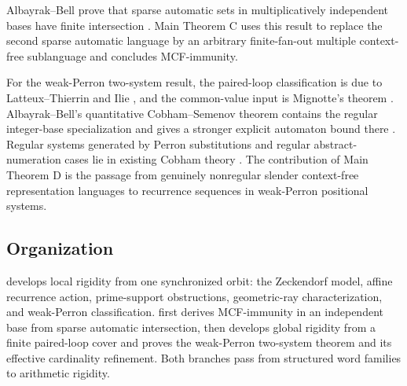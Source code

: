 Albayrak--Bell prove that sparse automatic sets in multiplicatively
independent bases have finite intersection
\cite[Theorem~1.1]{AlbayrakBell2023}. Main Theorem C uses this result to
replace the second sparse automatic language by an arbitrary finite-fan-out
multiple context-free sublanguage and concludes MCF-immunity.

For the weak-Perron two-system result, the paired-loop classification is
due to
Latteux--Thierrin and Ilie
\cite{LatteuxThierrin1983,Ilie1994,IlieRozenbergSalomaa2000}, and the
common-value input is Mignotte's theorem
\cite{Mignotte1978Intersection}. Albayrak--Bell's quantitative
Cobham--Semenov theorem contains the regular integer-base specialization
and gives a stronger explicit automaton bound there
\cite[Theorem~4.1]{AlbayrakBell2023}. Regular systems generated by Perron
substitutions and regular abstract-numeration cases lie in existing Cobham theory
\cite[Theorem~1]{Durand2011CobhamSubstitutions}%
\cite[Theorem~49]{CharlierLeroyRigo2013CobhamANS}. The contribution of
Main Theorem D is the passage from genuinely nonregular slender
context-free representation languages to recurrence sequences in
weak-Perron positional systems.

\subsection{Organization}

 develops local rigidity from one synchronized
orbit: the Zeckendorf model, affine recurrence action, prime-support
obstructions, geometric-ray characterization, and weak-Perron
classification.  first derives MCF-immunity in an
independent base from sparse automatic intersection, then develops global
rigidity from a finite paired-loop cover and proves the weak-Perron
two-system theorem and its effective cardinality refinement. Both branches
pass from structured word families to arithmetic rigidity.

